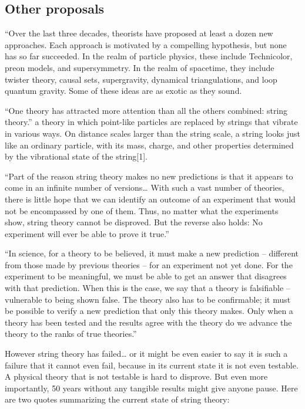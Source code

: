 \documentclass {article}
\begin{document}
\subsection{Other proposals}
	

“Over the last three decades, theorists have proposed at least a dozen new approaches. Each approach is motivated by a compelling hypothesis, but none has so far succeeded. In the realm of particle physics, these include Technicolor, preon models, and supersymmetry. In the realm of spacetime, they include twister theory, causal sets, supergravity, dynamical triangulations, and loop quantum gravity. Some of these ideas are as exotic as they sound.
	
	“One theory has attracted more attention than all the others combined: string theory.”  a theory in which point-like particles are replaced by strings that vibrate in various ways. On distance scales larger than the string scale, a string looks just like an ordinary particle, with its mass, charge, and other properties determined by the vibrational state of the string[1]. 
	
	“Part of the reason string theory makes no new predictions is that it appears to come in an infinite number of versions… With such a vast number of theories, there is little hope that we can identify an outcome of an experiment that would not be encompassed by one of them. Thus, no matter what the experiments show, string theory cannot be disproved. But the reverse also holds: No experiment will ever be able to prove it true.” 
	
	“In science, for a theory to be believed, it must make a new prediction -- different from those made by previous theories -- for an experiment not yet done. For the experiment to be meaningful, we must be able to get an answer that disagrees with that prediction. When this is the case, we say that a theory is falsifiable -- vulnerable to being shown false. The theory also has to be confirmable; it must be possible to verify a new prediction that only this theory makes. Only when a theory has been tested and the results agree with the theory do we advance the theory to the ranks of true theories.”
	
	However string theory has failed… or it might be even easier to say it is such a failure that it cannot even fail, because in its current state it is not even testable. A physical theory that is not testable is hard to disprove. But even more importantly, 50 years without any tangible results might give anyone pause. Here are two quotes summarizing the current state of string theory:
	
\end{document}
